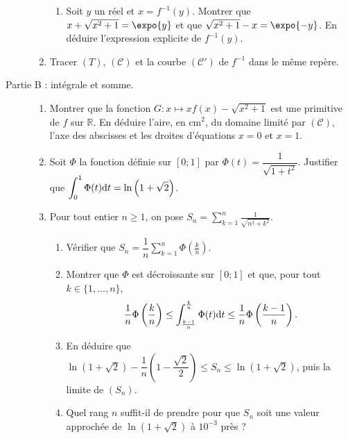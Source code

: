 \begin{exo}
\begin{description}
\begin{enumerate}
\begin{enumerate}
                                    \item Soit $y$ un r\'eel et $x = f^{-1}(y)$. Montrer que $x + \sqrt{x^2+1} = \expo{y}$ et que
                                          $\sqrt{x^2+1} - x = \expo{-y}$. En d\'eduire l'expression explicite de $f^{-1}(y)$.
                              \end{enumerate}
                        \item Tracer $(T)$, $(\mathscr{C})$ et la courbe $(\mathscr{C}')$ de $f^{-1}$ dans le m\^eme rep\`ere.
                  \end{enumerate}
            \item[Partie B : int\'egrale et somme.]
                  \begin{enumerate}
                        \item Montrer que la fonction $G : x \mapsto x f(x) - \sqrt{x^2+1}$ est une primitive de $f$ sur $\mathbb{R}$.
                              En d\'eduire l'aire, en $\text{cm}^2$, du domaine limit\'e par $(\mathscr{C})$, l'axe des abscisses et
                              les droites d'\'equations $x = 0$ et $x = 1$.
                        \item Soit $\Phi$ la fonction d\'efinie sur $[0 ; 1]$ par $\Phi(t) = \dfrac{1}{\sqrt{1+t^2}}$.
                              Justifier que $\displaystyle \int_0^1 \Phi(t) \mathrm{d}t = \ln \left( 1 + \sqrt{2} \right)$.
                        \item Pour tout entier $n \geq 1$, on pose
                              $\displaystyle S_n = \sum_{k=1}^{n} \frac{1}{\sqrt{n^2 + k^2}}$.
                              \begin{enumerate}
                                    \item V\'erifier que $S_n = \dfrac{1}{n} \displaystyle \sum_{k=1}^n \Phi\left( \frac{k}{n} \right)$.
                                    \item Montrer que $\Phi$ est d\'ecroissante sur $[0 ; 1]$ et que, pour tout $k \in \{1 , \ldots , n\}$,
                                          \[
                                                \frac{1}{n}\Phi\left( \frac{k}{n} \right) \leq \int_{\frac{k-1}{n}}^{\frac{k}{n}} \Phi(t) \mathrm{d}t
                                                \leq \frac{1}{n}\Phi\left( \frac{k-1}{n} \right) .
                                          \]
                                    \item En d\'eduire que
                                          $\ln\left( 1 + \sqrt{2} \right) - \dfrac{1}{n}\left( 1 - \dfrac{\sqrt{2}}{2} \right) \leq S_n
                                          \leq \ln\left( 1 + \sqrt{2} \right)$, puis la limite de $(S_n)$.
                                    \item Quel rang $n$ suffit-il de prendre pour que $S_n$ soit une valeur approch\'ee de
                                          $\ln\left(1 + \sqrt{2}\right)$ \`a $10^{-3}$ pr\`es ?
                              \end{enumerate}
                  \end{enumerate}
      \end{description}
\end{exo}
